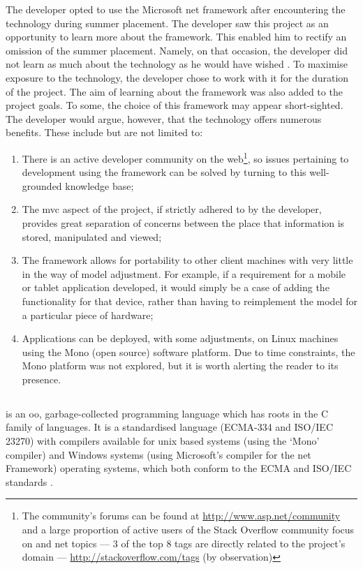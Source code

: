 The developer opted to use the Microsoft \gls{net} framework after encountering the technology during summer placement.   
The developer saw this project as an opportunity to learn more about the framework.  
This enabled him to rectify an omission of the summer placement.  Namely, on that occasion, the developer did not learn as much about the technology as he would have wished \cite{summerPlacementReport}.
To maximise exposure to the technology, the developer chose to work with it for the duration of the project.  The aim of learning about the framework was also added to the project goals. To some, the choice of this framework may appear short-sighted.  The developer would argue, however, that the technology offers numerous benefits.  These include but are not limited to: 
\begin{enumerate}
	\item There is an active developer community on the web\footnote{The community's forums can be found at \url{http://www.asp.net/community} and a large proportion of active users of the Stack Overflow community focus on \cs{} and \gls{net} topics --- 3 of the top 8 tags are directly related to the project's domain --- \url{http://stackoverflow.com/tags} (by observation)}, so issues pertaining to development using the framework can be solved by turning to this well-grounded knowledge base;
	\item The \gls{mvc} aspect of the project, if strictly adhered to by the developer, provides great separation of concerns between the place that information is stored, manipulated and viewed;
	\item The framework allows for portability to other client machines with very little in the way of model adjustment. For example, if a requirement for a mobile or tablet application developed, it would simply be a case of adding the functionality for that device, rather than having to reimplement the model for a particular piece of hardware;
	\item Applications can be deployed, with some adjustments, on Linux machines using the Mono (open source) software platform.  Due to time constraints, the Mono platform was not explored, but it is worth alerting the reader to its presence.
\end{enumerate}

\subsection{\cs}
\label{csharpDiscussion}
\cs{} is an \gls{oo}, garbage-collected programming language which has roots in the C family of languages.  It is a standardised language (ECMA-334 and ISO/IEC 23270) with compilers available for unix based systems (using the `Mono' compiler) and Windows systems (using Microsoft's \cs{} compiler for the \gls{net} Framework) operating systems, which both conform to the ECMA and ISO/IEC standards \cite{monoStandardised} \cite{csPL}.

